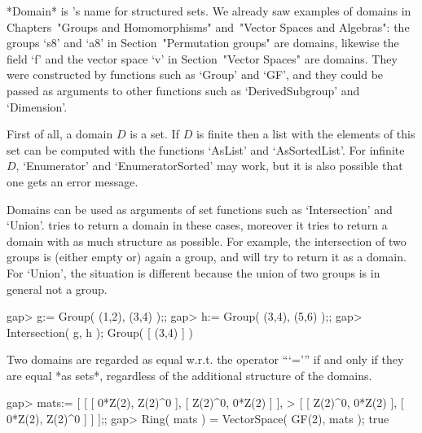 


*Domain* is {\GAP}'s name for structured sets.
We already saw examples of domains in Chapters~"Groups and Homomorphisms"
and~"Vector Spaces and Algebras":
the groups `s8' and `a8' in Section~"Permutation groups" are domains,
likewise the field `f' and the vector space `v' in
Section~"Vector Spaces" are domains.
They were constructed by functions such as `Group' and `GF',
and they could be passed as arguments to other functions such as
`DerivedSubgroup' and `Dimension'.



First of all, a domain $D$ is a set.
If $D$ is finite then a list with the elements of this set can be
computed with the functions `AsList' and `AsSortedList'.
For infinite $D$, `Enumerator' and `EnumeratorSorted' may work,
but it is also possible that one gets an error message.

Domains can be used as arguments of set functions such as `Intersection'
and `Union'.
{\GAP} tries to return a domain in these cases,
moreover it tries to return a domain with as much structure as possible.
For example, the intersection of two groups is (either empty or) again a
group, and {\GAP} will try to return it as a domain.
For `Union', the situation is different because the union of two groups
is in general not a group.

\beginexample
gap> g:= Group( (1,2), (3,4) );;
gap> h:= Group( (3,4), (5,6) );;
gap> Intersection( g, h );
Group( [ (3,4) ] )
\endexample

Two domains are regarded as equal w.r.t. the operator ```=''' if and only
if they are equal *as sets*, regardless of the additional structure of the
domains.

\beginexample
gap> mats:= [ [ [ 0*Z(2), Z(2)^0 ], [ Z(2)^0, 0*Z(2) ] ],
>             [ [ Z(2)^0, 0*Z(2) ], [ 0*Z(2), Z(2)^0 ] ] ];;
gap> Ring( mats ) = VectorSpace( GF(2), mats );
true
\endexample

